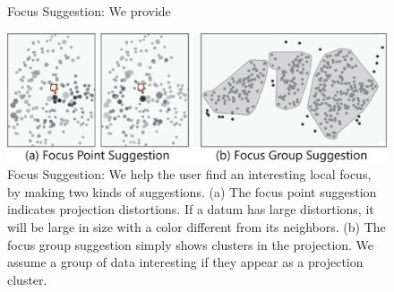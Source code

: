 \ifx
\begin{figure}[htbp]
\centering
{}
  \caption{Focus Suggestion: We provide}
\label{fig:suggestions}
  \end{figure}
  \else
\begin{figure}[htbp]
\centering
\includegraphics[width=1\linewidth]{images/suggestion.eps}
  \caption{Focus Suggestion: We help the user find an interesting local focus, by making two kinds of suggestions. (a) The focus point suggestion indicates projection distortions. If a datum has large distortions, it will be large in size with a color different from its neighbors. (b) The focus group suggestion simply shows clusters in the projection. We assume a group of data interesting if they appear as a projection cluster.}
\label{fig:suggestions}
\end{figure}
  \fi

